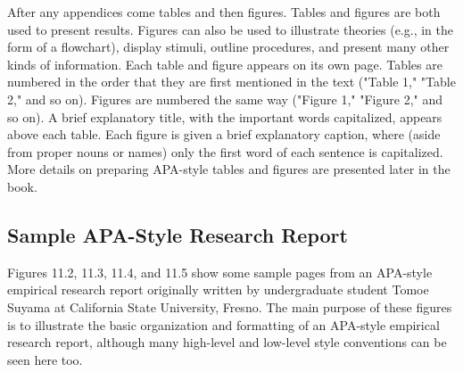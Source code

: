After any appendices come tables and then figures. Tables and figures are both used to present results. Figures can also be used to illustrate theories (e.g., in the form of a flowchart), display stimuli, outline procedures, and present many other kinds of information. Each table and figure appears on its own page. Tables are numbered in the order that they are first mentioned in the text ("Table 1," "Table 2," and so on). Figures are numbered the same way ("Figure 1," "Figure 2," and so on). A brief explanatory title, with the important words capitalized, appears above each table. Each figure is given a brief explanatory caption, where (aside from proper nouns or names) only the first word of each sentence is capitalized. More details on preparing APA-style tables and figures are presented later in the book.


\subsection{Sample APA-Style Research Report}


Figures 11.2, 11.3, 11.4, and 11.5 show some sample pages from an APA-style empirical research report originally written by undergraduate student Tomoe Suyama at California State University, Fresno. The main purpose of these figures is to illustrate the basic organization and formatting of an APA-style empirical research report, although many high-level and low-level style conventions can be seen here too.


